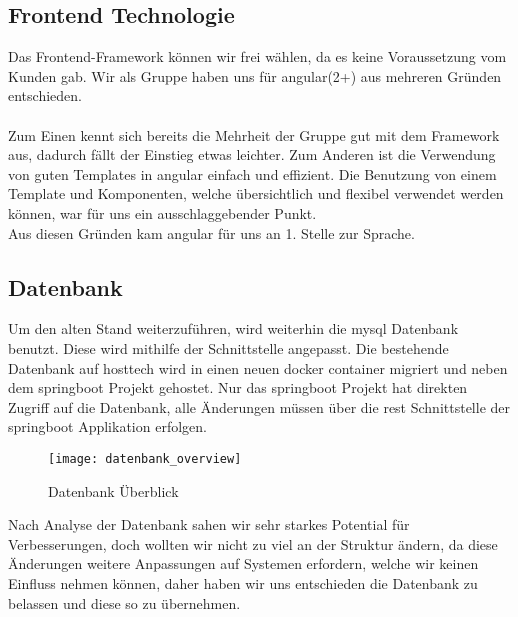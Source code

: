 \documentclass[../main.tex]{subfiles}
\begin{document}
	\subsection{Frontend Technologie}
	Das Frontend-Framework können wir frei wählen, da es keine Voraussetzung vom Kunden gab.
	Wir als Gruppe haben uns für \gls{angular}(2+) aus mehreren Gründen entschieden. \\
	\\
	Zum Einen kennt sich bereits die Mehrheit der Gruppe gut mit dem Framework aus, dadurch fällt der Einstieg etwas leichter. Zum Anderen ist die Verwendung von guten Templates in \gls{angular} einfach und effizient. Die Benutzung von einem Template und Komponenten, welche übersichtlich und flexibel verwendet werden können, war für uns ein ausschlaggebender Punkt. \\ 
	Aus diesen Gründen kam \gls{angular} für uns an 1. Stelle zur Sprache.
	
	\subsection{Datenbank}
	Um den alten Stand weiterzuführen, wird weiterhin die \gls{mysql} Datenbank benutzt. Diese wird mithilfe der Schnittstelle angepasst.
	Die bestehende Datenbank auf \gls{hosttech} wird in einen neuen \gls{docker} \gls{container} migriert und neben dem \gls{springboot} Projekt gehostet. Nur das \gls{springboot} Projekt hat direkten Zugriff auf die Datenbank, alle Änderungen müssen über die \gls{rest} Schnittstelle der \gls{springboot} Applikation erfolgen.
	
	\begin{figure}[H]
		\centering
		\texttt{[image: datenbank\_overview]}
		\caption{Datenbank Überblick}
		\label{fig:datenbank_overview}
	\end{figure}
	\par
	\noindent
	Nach Analyse der Datenbank sahen wir sehr starkes Potential für Verbesserungen, doch wollten wir nicht zu viel an der Struktur ändern, da diese Änderungen weitere Anpassungen auf Systemen erfordern, welche wir keinen Einfluss nehmen können, daher haben wir uns entschieden die Datenbank zu belassen und diese so zu übernehmen.
\end{document}
